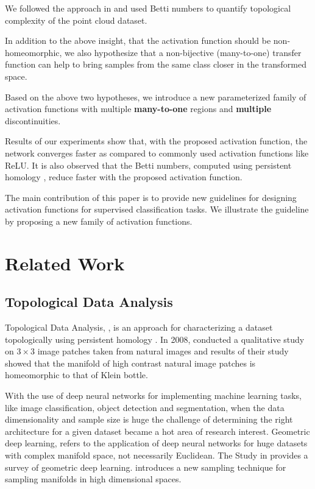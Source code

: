 \documentclass[wcp]{jmlr}
\begin{document}
We followed the approach in \cite{naitzat2020topology} and used Betti numbers to quantify  topological complexity of the point cloud dataset.

In addition to the above insight, that the activation function should be non-homeomorphic, we also hypothesize that a non-bijective (many-to-one) transfer function can help to bring samples from the same class closer in the transformed space.

Based on the above two  hypotheses, we introduce a new parameterized family of activation functions with multiple \textbf{many-to-one} regions and \textbf{multiple} discontinuities.

Results of our experiments show that, with the proposed activation function, the network converges faster as compared to commonly used activation functions like ReLU. It is also observed that the Betti numbers, computed using persistent homology \cite{naitzat2020topology}, reduce faster with the proposed activation function.

The main contribution of this paper is to provide new guidelines for designing  activation functions for supervised classification tasks. We illustrate the guideline by proposing a new family of activation functions.

\section{Related Work}
\subsection{Topological Data Analysis}
Topological Data Analysis, \cite{chazal2021introduction, smith2021topological}, is an approach for characterizing a dataset topologically using persistent homology \cite{edelsbrunner2008persistent}. In 2008, \cite{carlsson2008local} conducted a qualitative study on  $3\times3$ image patches taken from natural images and  results of their study showed that the manifold of  high contrast natural image patches is homeomorphic to that of Klein bottle.

With the use of deep neural networks for implementing machine learning tasks, like image classification, object detection and segmentation, when the data dimensionality and sample size is huge the challenge of determining the right architecture for a given dataset became a hot area of research interest. Geometric deep learning, refers to the application of deep neural networks for huge datasets with complex manifold space, not necessarily Euclidean. The Study in  \cite{bronstein2017geometric} provides a  survey of geometric deep learning.  \cite{saucan2007geometric} introduces a new sampling technique for sampling manifolds in high dimensional spaces.
\end{document}
